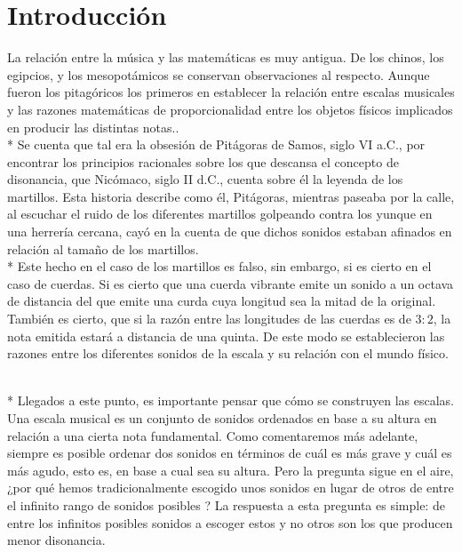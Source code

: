 \documentclass[11pt,a4paper]{article}
\begin{document}




\section{Introducción}

La relación entre la música y las matemáticas es muy antigua. De los chinos, los egipcios, y los mesopotámicos se conservan observaciones al respecto. Aunque fueron los pitagóricos los primeros en establecer la relación entre escalas musicales y las razones matemáticas de proporcionalidad entre los objetos físicos implicados en producir las distintas notas..
\\*
Se cuenta que tal era la obsesión de Pitágoras de Samos, siglo VI a.C., por encontrar los principios racionales sobre los que descansa el concepto de disonancia, que Nicómaco, siglo II d.C., cuenta sobre él la leyenda de los martillos. Esta historia describe como él, Pitágoras, mientras paseaba por la calle, al escuchar el ruido de los diferentes martillos golpeando contra los yunque en una herrería cercana, cayó en la cuenta de que dichos sonidos estaban afinados en relación al tamaño de los martillos. 
\\*
Este hecho en el caso de los martillos es falso, sin embargo, si es cierto en el caso de cuerdas. Si es cierto que una cuerda vibrante emite un sonido a un octava de distancia del que emite una curda cuya longitud sea la mitad de la original. También es cierto, que si la razón entre las longitudes de las cuerdas es de $3:2$, la nota emitida estará a distancia de una quinta. De este modo se establecieron las razones entre los diferentes sonidos de la escala y su relación con el mundo físico.

\\*
Llegados a este punto, es importante pensar que cómo se construyen las escalas. Una escala musical es un conjunto de sonidos ordenados en base a su altura en relación a una cierta nota fundamental. Como comentaremos más adelante, siempre es posible ordenar dos sonidos en términos de cuál es más grave y cuál es más agudo, esto es, en base a cual sea su altura. Pero la pregunta sigue en el aire, ¿por qué hemos tradicionalmente escogido unos sonidos en lugar de otros de entre el infinito rango de sonidos posibles ? La respuesta a esta pregunta es simple: de entre los infinitos posibles sonidos a escoger estos y no otros son los que producen menor disonancia.
\end{document}
